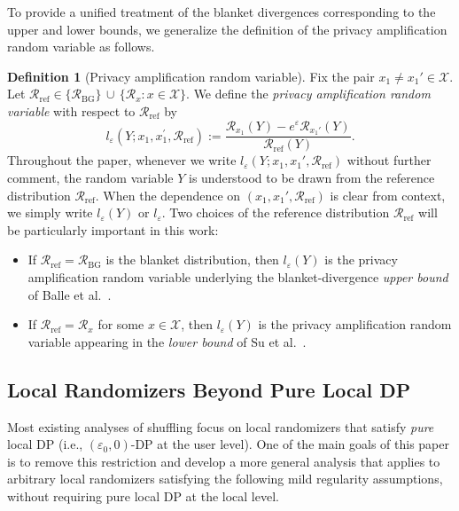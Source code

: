\documentclass{article}
\theoremstyle{plain}
\theoremstyle{definition}
\newtheorem{definition}{Definition}[section]
\begin{document}
To provide a unified treatment of the blanket divergences corresponding to the upper and lower bounds, we generalize the definition of the privacy amplification random variable as follows.
\begin{definition}[Privacy amplification random variable]
Fix the pair $x_1\neq x_1'\in\mathcal X$.
Let
$
  \mathcal R_{\mathrm{ref}}\in
  \bigl\{\mathcal R_{\mathrm{BG}}\bigr\}
  \,\cup\,
  \bigl\{\mathcal R_x : x\in\mathcal X\bigr\}
$.
We define the \emph{privacy amplification random variable} with respect to
$\mathcal R_{\mathrm{ref}}$ by
\[
  l_{\varepsilon}(Y;x_1,x_1^\prime,\mathcal{R}_{\mathrm{ref}})
  :=
  \frac{\mathcal R_{x_1}(Y) - e^{\varepsilon}\mathcal R_{x_1'}(Y)}
       {\mathcal R_{\mathrm{ref}}(Y)}.
\]
Throughout the paper, whenever we write
$l_{\varepsilon}(Y;x_1,x_1',\mathcal R_{\mathrm{ref}})$
without further comment, the random variable $Y$ is understood to be drawn
from the reference distribution $\mathcal R_{\mathrm{ref}}$. When the dependence on $(x_1,x_1',\mathcal R_{\mathrm{ref}})$ is clear from
context, we simply write $l_{\varepsilon}(Y)$ or $l_{\varepsilon}$. Two choices of the reference distribution $\mathcal R_{\mathrm{ref}}$ will be
particularly important in this work:
\begin{itemize}
  \item If $\mathcal R_{\mathrm{ref}}=\mathcal R_{\mathrm{BG}}$ is the blanket
  distribution, then $l_{\varepsilon}(Y)$ is
  the privacy amplification random variable underlying the
  blanket-divergence \emph{upper bound} of
  Balle et al.~\cite{ballePrivacyBlanketShuffle2019}.

  \item If $\mathcal R_{\mathrm{ref}}=\mathcal R_x$ for some $x\in\mathcal X$,
  then $l_{\varepsilon}(Y)$ is the privacy amplification random variable
  appearing in the \emph{lower bound} of
  Su et al.~\cite{suDecompositionBasedOptimalBounds2025}.
\end{itemize}
\end{definition}


\subsection{Local Randomizers Beyond Pure Local DP}


Most existing analyses of shuffling focus on
local randomizers that satisfy \emph{pure} local DP
(i.e., $(\varepsilon_0,0)$-DP at the user level).
One of the main goals of this paper is to remove this restriction and
develop a more general analysis that applies to arbitrary local
randomizers satisfying the following mild regularity assumptions, without requiring
pure local DP at the local level.
\end{document}
